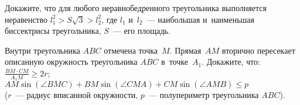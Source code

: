 \begin{problems}
\item
Докажите, что для любого неравнобедренного треугольника выполняется неравенство
$l_{1}^2 > S \sqrt{3} > l_{2}^2$, где $l_{1}$ и~$l_{2}$~--- наибольшая
и~наименьшая биссектрисы треугольника, $S$~--- его площадь.

\item
Внутри треугольника $ABC$ отмечена точка~$M$.
Прямая~$AM$ вторично пересекает описанную окружность треугольника $ABC$
в~точке~$A_1$.
Докажите, что:
\\[0.5ex]
\subproblem
\( \displaystyle
    \frac{BM \cdot CM}{A_1 M}
\geq
    2 r
\);
\\[0.5ex]
\subproblem
\(
    AM \sin( \angle BMC) + BM \sin( \angle CMA) + CM \sin( \angle AMB)
\leq
    p
\)\\
($r$~--- радиус вписанной окружности, $p$~--- полупериметр треугольника $ABC$).

\end{problems}

